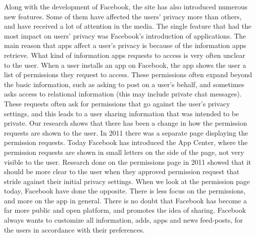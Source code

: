 Along with the development of Facebook, the site has also introduced numerous new features. Some of them have affected the users' privacy more than others, and have received a lot of attention in the media. The single feature that had the most impact on users' privacy was Facebook's introduction of applications. 
The main reason that apps affect a user's privacy is because of the information apps retrieve. What kind of information apps requests to access is very often unclear to the user. When a user installs an app on Facebook, the app shows the user a list of permissions they request to access. These permissions often expand beyond the basic information, such as asking to post on a user's behalf, and sometimes asks access to relational information (this may include private chat messages). These requests often ask for permissions that go against the user's privacy settings, and this leads to a user sharing information that was intended to be private. Our research shows that there has been a change in how the permission requests are shown to the user. In 2011 there was a separate page displaying the permission requests. Today Facebook has introduced the App Center, where the permission requests are shown in small letters on the side of the page, not very visible to the user. Research done on the permissions page in 2011 showed that it should be more clear to the user when they approved permission request that stride against their initial privacy settings. When we look at the permission page today, Facebook have done the opposite. There is less focus on the permissions, and more on the app in general.  
There is no doubt that Facebook has become a far more public and open platform, and promotes the idea of sharing. Facebook always wants to customize all information, adds, apps and news feed-posts, for the users in accordance with their preferences.

